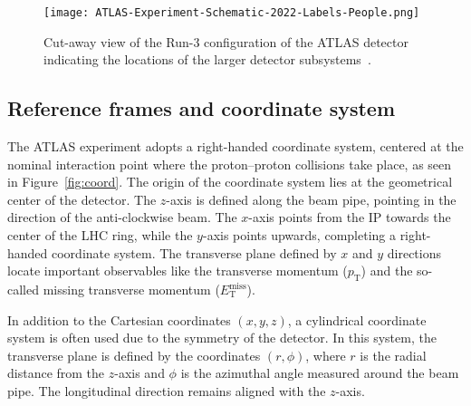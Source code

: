 \begin{figure}[htbp]
    \centering
        \texttt{[image: ATLAS-Experiment-Schematic-2022-Labels-People.png]}
    \caption{Cut-away view of the Run-3 configuration of the ATLAS detector indicating the locations of the larger detector subsystems~\cite{Bianchi:2837191}.}
    \label{fig:ATLASdet}
\end{figure}

\subsection{Reference frames and coordinate system}
\label{sec:coordinates}

The ATLAS experiment adopts a right-handed coordinate system, centered at the nominal interaction point where the proton--proton collisions take place, as seen in Figure~\ref{fig:coord}. The origin of the coordinate system lies at the geometrical center of the detector. The $z$-axis is defined along the beam pipe, pointing in the direction of the anti-clockwise beam. The $x$-axis points from the IP towards the center of the LHC ring, while the $y$-axis points upwards, 
completing a right-handed coordinate system. The transverse plane defined by $x$ and $y$ directions locate important observables like the transverse momentum ($p_{\text{T}}$) and the so-called missing transverse momentum ($E^{\text{miss}}_{\text{T}}$).

In addition to the Cartesian coordinates $(x, y, z)$, a cylindrical coordinate system is often used due to the symmetry of the detector. In this system, the transverse plane is defined by the coordinates $(r, \phi)$, where $r$ is the radial distance from the $z$-axis and $\phi$ is the azimuthal angle measured around the beam pipe. The longitudinal direction remains aligned with the $z$-axis.

